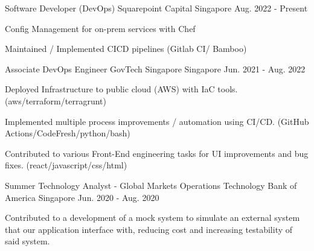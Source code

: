 

\begin{cventries}

  \cventry
    {Software Developer (DevOps)} %
    {Squarepoint Capital} %
    {Singapore} %
    {Aug. 2022 - Present} %
    {
      \begin{cvitems} %
        \item {Config Management for on-prem services with Chef}
        \item {Maintained / Implemented CICD pipelines (Gitlab CI/ Bamboo)}
      \end{cvitems}
    }

  \cventry
    {Associate DevOps Engineer} %
    {GovTech Singapore} %
    {Singapore} %
    {Jun. 2021 - Aug. 2022} %
    {
      \begin{cvitems} %
        \item {Deployed Infrastructure to public cloud (AWS) with IaC tools. (aws/terraform/terragrunt)}
        \item {Implemented multiple process improvements / automation using CI/CD. (GitHub Actions/CodeFresh/python/bash)}
        \item {Contributed to various Front-End engineering tasks for UI improvements and bug fixes. (react/javascript/css/html)}
      \end{cvitems}
    }

  \cventry
    {Summer Technology Analyst - Global Markets Operations Technology} %
    {Bank of America} %
    {Singapore} %
    {Jun. 2020 - Aug. 2020} %
    {
      \begin{cvitems} %
        \item {Contributed to a development of a mock system to simulate an external system that our application interface with, reducing cost and increasing testability of said system.}
      \end{cvitems}
    }


\end{cventries}
